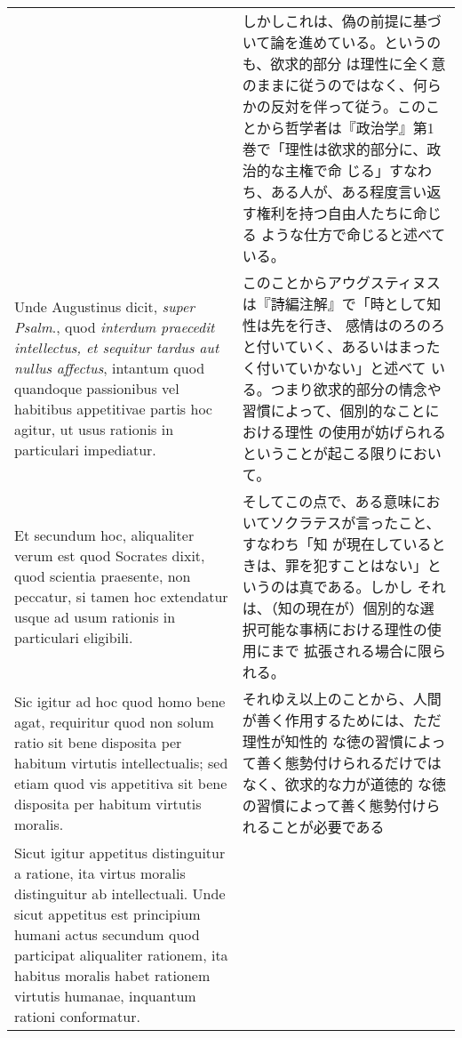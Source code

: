 \documentclass[10pt]{jsarticle}
\begin{document}
\begin{longtable}{p{21em}p{21em}}
&

しかしこれは、偽の前提に基づいて論を進めている。というのも、欲求的部分
は理性に全く意のままに従うのではなく、何らかの反対を伴って従う。このこ
とから哲学者は『政治学』第1巻で「理性は欲求的部分に、政治的な主権で命
じる」すなわち、ある人が、ある程度言い返す権利を持つ自由人たちに命じる
ような仕方で命じると述べている。
 
\\


 Unde Augustinus dicit, {\itshape super Psalm}., quod {\itshape
 interdum praecedit intellectus, et sequitur tardus aut nullus
 affectus}, intantum quod quandoque passionibus vel habitibus
 appetitivae partis hoc agitur, ut usus rationis in particulari
 impediatur.

&

 このことからアウグスティヌスは『詩編注解』で「時として知性は先を行き、
 感情はのろのろと付いていく、あるいはまったく付いていかない」と述べて
 いる。つまり欲求的部分の情念や習慣によって、個別的なことにおける理性
 の使用が妨げられるということが起こる限りにおいて。
 
\\


 Et secundum hoc, aliqualiter verum est quod Socrates dixit, quod
 scientia praesente, non peccatur, si tamen hoc extendatur usque ad
 usum rationis in particulari eligibili.

&

 そしてこの点で、ある意味においてソクラテスが言ったこと、すなわち「知
 が現在しているときは、罪を犯すことはない」というのは真である。しかし
 それは、（知の現在が）個別的な選択可能な事柄における理性の使用にまで
 拡張される場合に限られる。
 
\\



 Sic igitur ad hoc quod homo bene agat, requiritur quod non solum
 ratio sit bene disposita per habitum virtutis intellectualis; sed
 etiam quod vis appetitiva sit bene disposita per habitum virtutis
 moralis.

&

 それゆえ以上のことから、人間が善く作用するためには、ただ理性が知性的
 な徳の習慣によって善く態勢付けられるだけではなく、欲求的な力が道徳的
 な徳の習慣によって善く態勢付けられることが必要である
 
\\



 Sicut igitur appetitus distinguitur a ratione, ita virtus moralis
 distinguitur ab intellectuali. Unde sicut appetitus est principium
 humani actus secundum quod participat aliqualiter rationem, ita
 habitus moralis habet rationem virtutis humanae, inquantum rationi
 conformatur.


\end{longtable}
\end{document}
